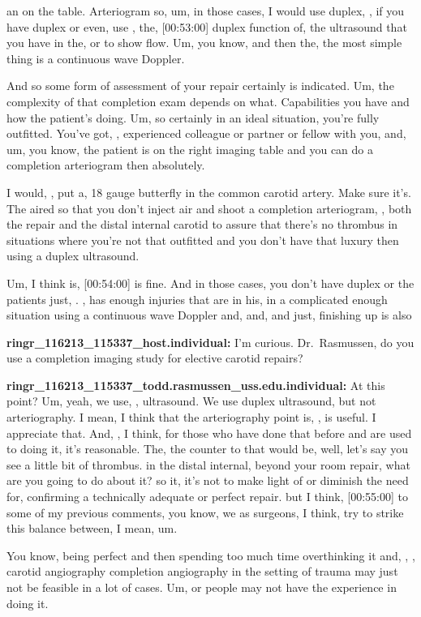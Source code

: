 \documentclass[
]{book}
\begin{document}
an on the table. Arteriogram so, um, in those cases, I would use duplex,
, if you have duplex or even, use , the, {[}00:53:00{]} duplex function of,
the ultrasound that you have in the, or to show flow. Um, you know, and
then the, the most simple thing is a continuous wave Doppler.

And so some form of assessment of your repair certainly is indicated.
Um, the complexity of that completion exam depends on what. Capabilities
you have and how the patient's doing. Um, so certainly in an ideal
situation, you're fully outfitted. You've got, , experienced colleague
or partner or fellow with you, and, um, you know, the patient is on the
right imaging table and you can do a completion arteriogram then
absolutely.

I would, , put a, 18 gauge butterfly in the common carotid artery. Make
sure it's. The aired so that you don't inject air and shoot a completion
arteriogram, , both the repair and the distal internal carotid to assure
that there's no thrombus in situations where you're not that outfitted
and you don't have that luxury then using a duplex ultrasound.

Um, I think is, {[}00:54:00{]} is fine. And in those cases, you don't have
duplex or the patients just, . , has enough injuries that are in his, in
a complicated enough situation using a continuous wave Doppler and, and,
and just, finishing up is also

\textbf{ringr\_116213\_115337\_host.individual:} I'm curious. Dr.~Rasmussen, do
you use a completion imaging study for elective carotid repairs?

\textbf{ringr\_116213\_115337\_todd.rasmussen\_uss.edu.individual:} At this
point? Um, yeah, we use, , ultrasound. We use duplex ultrasound, but not
arteriography. I mean, I think that the arteriography point is, , is
useful. I appreciate that. And, , I think, for those who have done that
before and are used to doing it, it's reasonable. The, the counter to
that would be, well, let's say you see a little bit of thrombus. in the
distal internal, beyond your room repair, what are you going to do about
it? so it, it's not to make light of or diminish the need for,
confirming a technically adequate or perfect repair. but I think,
{[}00:55:00{]} to some of my previous comments, you know, we as surgeons, I
think, try to strike this balance between, I mean, um.

You know, being perfect and then spending too much time overthinking it
and, , , carotid angiography completion angiography in the setting of
trauma may just not be feasible in a lot of cases. Um, or people may not
have the experience in doing it.
\end{document}

